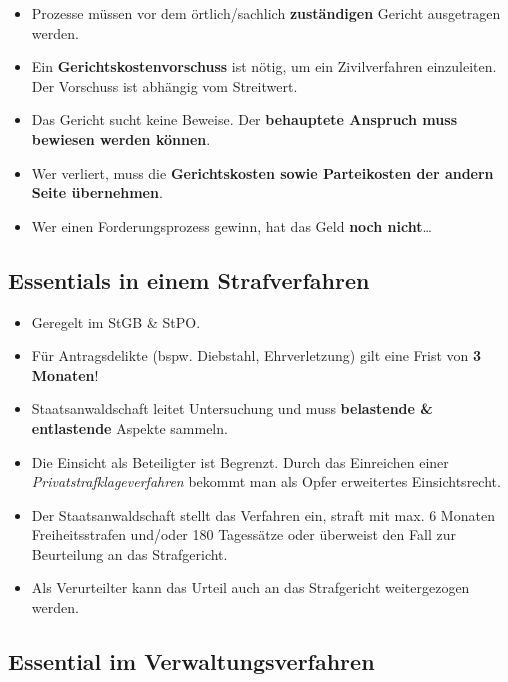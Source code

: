 \begin{itemize}
\tightlist
\item
  Prozesse müssen vor dem örtlich/sachlich \textbf{zuständigen} Gericht
  ausgetragen werden.
\item
  Ein \textbf{Gerichtskostenvorschuss} ist nötig, um ein Zivilverfahren
  einzuleiten. Der Vorschuss ist abhängig vom Streitwert.
\item
  Das Gericht sucht keine Beweise. Der \textbf{behauptete Anspruch muss
  bewiesen werden können}.
\item
  Wer verliert, muss die \textbf{Gerichtskosten sowie Parteikosten der
  andern Seite übernehmen}.
\item
  Wer einen Forderungsprozess gewinn, hat das Geld \textbf{noch
  nicht}\ldots{}
\end{itemize}

\hypertarget{essentials-in-einem-strafverfahren}{%
\subsection{Essentials in einem
Strafverfahren}\label{essentials-in-einem-strafverfahren}}

\begin{itemize}
\tightlist
\item
  Geregelt im StGB \& StPO.
\item
  Für Antragsdelikte (bspw. Diebstahl, Ehrverletzung) gilt eine Frist
  von \textbf{3 Monaten}!
\item
  Staatsanwaldschaft leitet Untersuchung und muss \textbf{belastende \&
  entlastende} Aspekte sammeln.
\item
  Die Einsicht als Beteiligter ist Begrenzt. Durch das Einreichen einer
  \emph{Privatstrafklageverfahren} bekommt man als Opfer erweitertes
  Einsichtsrecht.
\item
  Der Staatsanwaldschaft stellt das Verfahren ein, straft mit max. 6
  Monaten Freiheitsstrafen und/oder 180 Tagessätze oder überweist den
  Fall zur Beurteilung an das Strafgericht.
\item
  Als Verurteilter kann das Urteil auch an das Strafgericht
  weitergezogen werden.
\end{itemize}

\hypertarget{essential-im-verwaltungsverfahren}{%
\subsection{Essential im
Verwaltungsverfahren}\label{essential-im-verwaltungsverfahren}}

